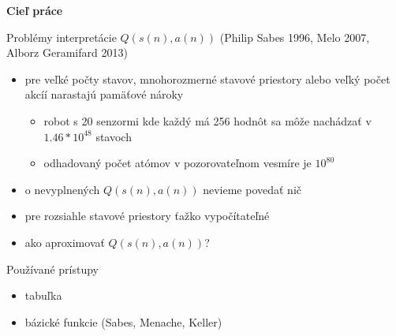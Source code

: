 \documentclass[xcolor=dvipsnames]{beamer}
\begin{document}
\begin{frame}{\bf Cieľ práce}

\begin{block}{Problémy interpretácie $Q(s(n), a(n))$}
  \vspace{-2mm}
  {\footnotesize (Philip Sabes 1996, Melo 2007, Alborz Geramifard 2013)}
  \vspace{-1mm}
  \begin{itemize}
    \vspace{-1mm}
    \item pre veľké počty stavov, mnohorozmerné stavové priestory alebo veľký počet akcíí narastajú pamäťové nároky

          \begin{itemize}
          \item robot s 20 senzormi kde každý má 256 hodnôt sa môže nachádzať v $1.46*10^{48}$ stavoch
          \item odhadovaný počet atómov v pozorovateľnom vesmíre je $10^{80}$
          \end{itemize}

    \vspace{-1mm}
    \item o nevyplnených $Q(s(n), a(n))$ nevieme povedať nič

    \vspace{-1mm}
    \item pre rozsiahle stavové priestory ťažko vypočítateľné

    \vspace{-1mm}
    \item ako aproximovať $Q(s(n), a(n))$?

  \end{itemize}

\end{block}

\vspace{-3mm}

\begin{exampleblock}{Používané prístupy}
  \vspace{-3mm}
  \begin{itemize}

  \vspace{-1mm}
  \item tabuľka

  \vspace{-1mm}
  \item bázické funkcie {\footnotesize (Sabes, Menache,  Keller)}


\end{itemize}
\end{exampleblock}
\end{frame}
\end{document}

